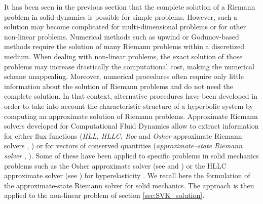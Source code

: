 It has been seen in the previous section that the complete solution of a Riemann problem in solid dynamics is possible for simple problems.
However, such a solution may become complicated for multi-dimensional problems or for other non-linear problems. 
Numerical methods such as upwind or Godunov-based methods \cite{Leveque} require the solution of many Riemann problems within a discretized medium.
When dealing with non-linear problems, the exact solution of those problems may increase drastically the computational cost, making the numerical scheme unappealing.
Moreover, numerical procedures often require only little information about the solution of Riemann problems and do not need the complete solution. In that context, alternative procedures have been developed in order to take into account the characteristic structure of a hyperbolic system by computing an approximate solution of Riemann problems.
Approximate Riemann solvers developed for Computational Fluid Dynamics allow to extract information for either flux functions (\textit{HLL, HLLC, Roe} and \textit{Osher} approximate Riemann solvers \cite{Trangenstein}, \cite{Toro}) or for vectors of conserved quantities (\textit{approximate--state Riemann solver} \cite[Ch.9]{Toro}, \cite[Ch.22]{Leveque}).
Some of these have been applied to specific problems in solid mechanics problems such as the Osher approximate solver (see \cite{Lee_FVM} and \cite{Haider_FVM}) or the HLLC approximate solver (see \cite{Ortega_HLLD}) for hyperelasticity .
We recall here the formulation of the approximate-state Riemann solver for solid mechanics.
The approach is then applied to the non-linear problem of section \ref{sec:SVK_solution}.

